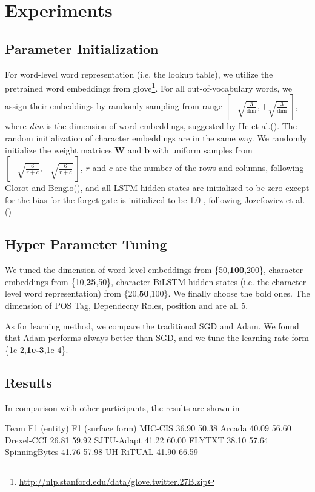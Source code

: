 \section{Experiments}
\label{sec:eval}

\subsection{Parameter Initialization}
For word-level word representation (i.e. the lookup table), 
we utilize the pretrained word embeddings from glove\footnote{\url{http://nlp.stanford.edu/data/glove.twitter.27B.zip}}.
For all out-of-vocabulary words, we assign their embeddings by randomly sampling from range $\left[-\sqrt{\frac{3}{\text{dim}}}, +\sqrt{\frac{3}{\text{dim}}}~\right]$, where \textit{dim} is the dimension of word embeddings, suggested by He et al.(\citeyear{DBLP:conf/iccv/HeZRS15}). The random initialization of character embeddings are in the same way.
We randomly initialize the weight matrices $\mathbf{W}$ and $\mathbf{b}$ with uniform samples from 
$\left[-\sqrt{\frac{6}{r+c}}, +\sqrt{\frac{6}{r+c}}~\right]$, 
$r$ and $c$ are the number of the rows and columns, following Glorot and Bengio(\citeyear{DBLP:journals/jmlr/GlorotB10}), and all LSTM hidden states are initialized to be zero except for the bias for the forget gate is initialized to be 1.0 , following Jozefowicz et al.(\citeyear{DBLP:conf/icml/JozefowiczZS15}) 


\subsection{Hyper Parameter Tuning}
We tuned the dimension of word-level embeddings from \{50,\textbf{100},200\}, character embeddings from \{10,\textbf{25},50\}, character BiLSTM hidden states (i.e. the character level word representation)  from  \{20,\textbf{50},100\}. 
We finally choose the bold ones.
The dimension of POS Tag, Dependecny Roles, position and  are all 5.

As for learning method, we compare the traditional SGD and Adam.
We found that Adam performs always better than SGD, and we tune the learning rate form \{1e-2,\textbf{1e-3},1e-4\}.

\subsection{Results} 
In comparison with other participants, the results are shown in 


Team	F1 (entity)	F1 (surface form)
MIC-CIS	36.90	50.38
Arcada	40.09	56.60
Drexel-CCI	26.81	59.92
SJTU-Adapt	41.22	60.00
FLYTXT	38.10	57.64
SpinningBytes	41.76	57.98
UH-RiTUAL	41.90	66.59

